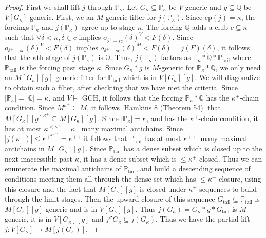 \documentclass[10pt,leqno]{amsart}
\begin{document}
\begin{proof}
First we shall lift $j$ through $\mathbb{P}_{\kappa}$. Let $G_{\kappa} \subseteq \mathbb{P}_{\kappa}$ be $V$-generic and $g \subseteq \mathbb{Q}$ be $V[G_{\kappa}]$-generic. First, we an $M$-generic filter for $j(\mathbb{P}_{\kappa})$. Since cp$(j) = \kappa$, the forcings $\mathbb{P}_{\kappa}$ and $j(\mathbb{P}_{\kappa})$ agree up to stage $\kappa$. The forcing $\mathbb{Q}$ adds a club $c \subseteq \kappa$ such that $\forall \delta < \kappa, \delta \in c$ implies $o_{\delta^+-sc}(\delta)^V < F(\delta)$. Since $o_{\delta^+-sc}(\delta)^V < F(\delta)$ implies $o_{\delta^+-sc}(\delta)^M < F(\delta) = j(F)(\delta)$, it follows that the $\kappa$th stage of $j(\mathbb{P}_{\kappa})$ is $\mathbb{Q}$. Thus, $j(\mathbb{P}_{\kappa})$ factors as $\mathbb{P}_{\kappa}*\dot{\mathbb{Q}}*\mathbb{P}_{\mbox{tail}}$ where $\mathbb{P}_{\mbox{tail}}$ is the forcing past stage $\kappa$. Since $G_{\kappa}*g$ is $M$-generic for $\mathbb{P}_{\kappa}*\dot{\mathbb{Q}}$, we only need an $M[G_{\kappa}][g]$-generic filter for $\mathbb{P}_{\mbox{tail}}$ which is in $V[G_{\kappa}][g]$. We will diagonalize to obtain such a filter, after checkiing that we have met the criteria. Since $|\mathbb{P}_{\kappa}| = |\mathbb{Q}| = \kappa$, and $V \models$ GCH, it follows that the forcing $\mathbb{P}_{\kappa}*\dot{\mathbb{Q}}$ has the $\kappa^+$-chain condition. Since $M^{\kappa^+} \subseteq M$, it follows [Hamkins 8 (Theorem 54)] that $M[G_{\kappa}][g]^{\kappa^+} \subseteq M[G_{\kappa}][g]$. Since $|\mathbb{P}_{\kappa}| = \kappa$, and has the $\kappa^+$-chain condition, it has at most $\kappa^{<\kappa^+} = \kappa^+$ many maximal antichains. Since $|j(\kappa^+)| \le \kappa^{+^{\kappa^{+^{<\kappa}}}} = \kappa^{++}$it follows that $\mathbb{P}_{\mbox{tail}}$ has at most $\kappa^{++}$ many maximal antichains in $M[G_{\kappa}][g]$. Since $\mathbb{P}_{\mbox{tail}}$ has a dense subset which is closed up to the next inaccessible past $\kappa$, it has a dense subset which is $\le \kappa^+$-closed. Thus we can enumerate the maximal antichains of $\mathbb{P}_{\mbox{tail}}$, and build a descending sequence of conditions meeting them all through the dense set which has $\le \kappa^+$-closure, using this closure and the fact that $M[G_{\kappa}][g]$ is closed under $\kappa^+$-sequences to build through the limit stages. Then the upward closure of this sequence $G_{\mbox{tail}} \subseteq \mathbb{P}_{\mbox{tail}}$ is $M[G_{\kappa}][g]$-generic and is in $V[G_{\kappa}][g]$. Thus $j(G_{\kappa}) = G_{\kappa}*g*G_{\mbox{tail}}$ is $M$-generic, it is in $V[G_{\kappa}][g]$ and $j''G_{\kappa} \subseteq j(G_{\kappa})$. Thus we have the partial lift $j:V[G_{\kappa}] \to M[j(G_{\kappa})]$.


\end{proof}
\end{document}
